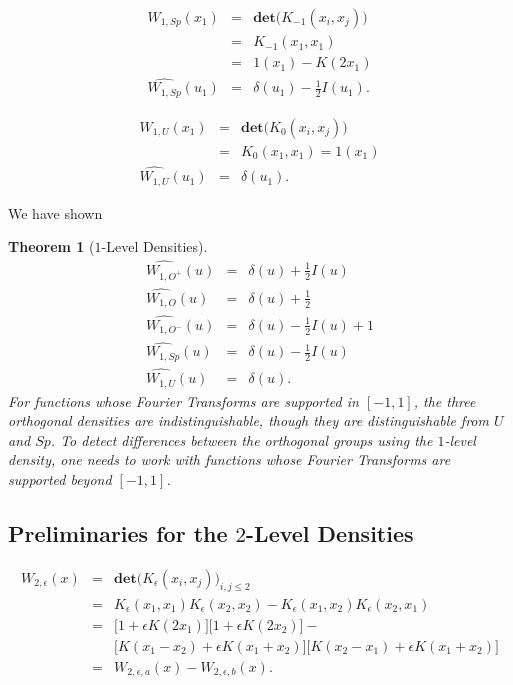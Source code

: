 \documentclass{compositio}
\newtheorem{thm}{Theorem}[section]
\newcommand{\foh}{\frac{1}{2}}  %
\begin{document}
\begin{eqnarray}
W_{1,Sp}(x_1) & = & \textbf{det} \Big( K_{-1}(x_i,x_j) \Big)
\nonumber\\ & = & K_{-1}(x_1,x_1) \nonumber\\ &=& 1(x_1) - K(2x_1)
\nonumber\\ \widehat{W_{1,Sp} }(u_1) & = & \delta(u_1) - \foh
I(u_1).
\end{eqnarray}


\begin{eqnarray}
W_{1,U}(x_1) & = & \textbf{det} \Big( K_0(x_i,x_j)\Big)
\nonumber\\ & = & K_0(x_1,x_1) = 1(x_1) \nonumber\\
\widehat{W_{1,U} }(u_1) & = & \delta(u_1).
\end{eqnarray}


We have shown
\begin{thm}[$1$-Level Densities]\label{thmonelevel}
\begin{eqnarray}
\widehat{W_{1,O^+} }(u) & = & \delta(u) + \foh I(u) \nonumber\\
\widehat{W_{1,O} }(u) & = & \delta(u) + \foh \nonumber\\
\widehat{W_{1,O^-} }(u) & = & \delta(u) - \foh I(u) + 1
\nonumber\\ \widehat{W_{1,Sp} }(u) & = & \delta(u) - \foh I(u)
\nonumber\\ \widehat{W_{1,U} }(u) & = & \delta(u).
\end{eqnarray}
For functions whose Fourier Transforms are supported in $[-1,1]$,
the three orthogonal densities are indistinguishable, though they
are distinguishable from $U$ and $Sp$. To detect differences
between the orthogonal groups using the $1$-level density, one
needs to work with functions whose Fourier Transforms are
supported beyond $[-1,1]$.
\end{thm}


\subsection{Preliminaries for the $2$-Level Densities}

\begin{eqnarray}
W_{2,\epsilon}(x) & = & \textbf{det} \Big( K_\epsilon(x_i,x_j)
\Big)_{i,j \leq 2} \nonumber\\ & = &
K_\epsilon(x_1,x_1)K_\epsilon(x_2,x_2) -
K_\epsilon(x_1,x_2)K_\epsilon(x_2,x_1) \nonumber\\ & = & \Big[ 1 +
\epsilon K(2x_1) \Big] \Big[1 + \epsilon K(2x_2) \Big] -
\nonumber\\ & & \Big[K(x_1-x_2) + \epsilon K(x_1+x_2) \Big] \Big[
K(x_2-x_1) + \epsilon K(x_1+x_2) \Big] \nonumber\\ & = &
W_{2,\epsilon,a}(x) - W_{2,\epsilon,b}(x).
\end{eqnarray}
\end{document}
